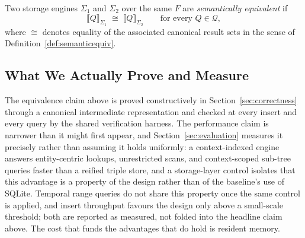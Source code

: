 Two storage engines $\Sigma_1$ and $\Sigma_2$ over the same $F$ are
\emph{semantically equivalent} if
\[
    \llbracket Q \rrbracket_{\Sigma_1} \;\cong\; \llbracket Q \rrbracket_{\Sigma_2}
    \qquad \text{for every } Q \in \mathcal{Q},
\]
where $\cong$ denotes equality of the associated canonical result sets in
the sense of Definition~\ref{def:semanticequiv}.

\subsection{What We Actually Prove and Measure}
\label{sec:problem:scope}

The equivalence claim above is proved constructively in
Section~\ref{sec:correctness} through a canonical intermediate representation
and checked at every insert and every query by the shared verification
harness. The performance claim is narrower than it might first appear, and
Section~\ref{sec:evaluation} measures it precisely rather than assuming it
holds uniformly: a context-indexed engine answers entity-centric lookups,
unrestricted scans, and context-scoped sub-tree queries faster than a
reified triple store, and a storage-layer control isolates that this
advantage is a property of the design rather than of the baseline's use of
SQLite. Temporal range queries do not share this property once the same
control is applied, and insert throughput favours the design only above a
small-scale threshold; both are reported as measured, not folded into the
headline claim above. The cost that funds the advantages that do hold is
resident memory.
